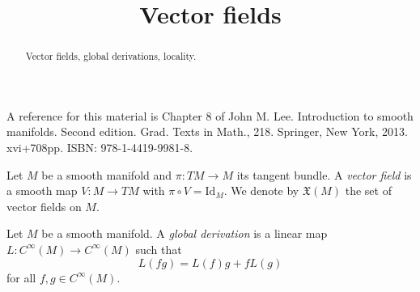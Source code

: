\documentclass{ximera}
\title{Vector fields}
\begin{document}
    \begin{abstract} Vector fields, global derivations,  locality. 
    \end{abstract}
    \maketitle


    A reference for this material is Chapter 8 of John M. Lee. Introduction to smooth manifolds. Second edition. Grad. Texts in Math., 218. Springer, New York, 2013. xvi+708pp. ISBN: 978-1-4419-9981-8.

    \begin{definition}
        Let $M$ be a smooth manifold and $\pi : TM \to M$ its tangent bundle. A \emph{vector field} is a smooth map  $V : M \to TM$ with $\pi \circ V = \text{Id}_M$. We denote by $\mathfrak{X}(M)$ the set of vector fields  on $M$. 
    \end{definition}

    \begin{definition}\label{thm:global-derivations}
        Let $M$ be a smooth manifold. A \emph{global derivation} is a linear map $ L : C^{\infty} (M)  \to C^{\infty}(M) $ such that 
        \[   L(fg) = L(f) g + f L(g)       \]
        for all $f,g \in C^{\infty}(M)$.  
    \end{definition}
\end{document}
